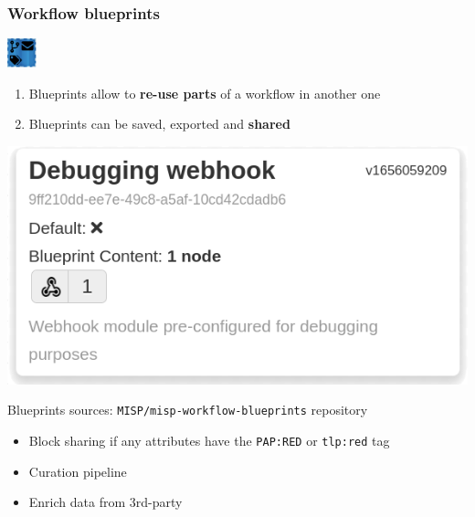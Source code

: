\begin{frame}
    \frametitle{Workflow blueprints}
    \hspace*{0.9\textwidth}\includegraphics[width=32px]{pictures/blueprint-32.png}
    \vspace*{-2em}
    \begin{enumerate}
        \item Blueprints allow to \textbf{re-use parts} of a workflow in another one
        \item Blueprints can be saved, exported and \textbf{shared}
    \end{enumerate}
    \begin{center}
        \includegraphics[width=0.5\linewidth]{pictures/blueprint-debugging.png}
    \end{center}
    Blueprints sources: \texttt{MISP/misp-workflow-blueprints} repository
    \begin{itemize}
        \item Block sharing if any attributes have the \texttt{PAP:RED} or \texttt{tlp:red} tag
        \item Curation pipeline
        \item Enrich data from 3rd-party
    \end{itemize}
\end{frame}

